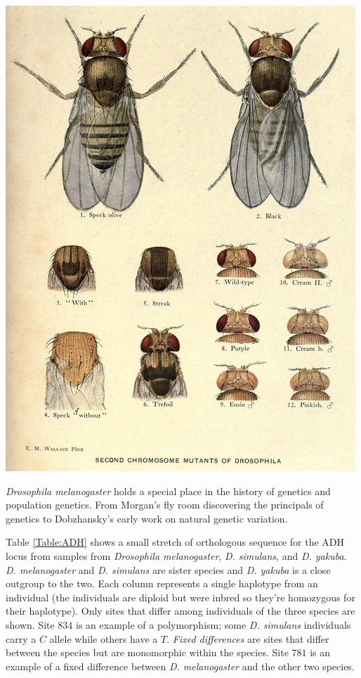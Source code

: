 \begin{marginfigure}[3cm]
\begin{center}
\includegraphics[width= 0.8 \textwidth]{illustration_images/alleles_genotypes/Drosophila_mel/Drosophila_mel_mutants.jpg}
\end{center}
\caption{ {\it Drosophila melanogaster} holds a special place in the
  history of genetics and population genetics. From Morgan's fly room discovering the principals of genetics to Dobzhansky's early work
  on natural genetic variation.   } \label{fig:dros}
\end{marginfigure}



Table \ref{Table:ADH} shows a small stretch of orthologous sequence for
the ADH locus from samples from {\it Drosophila melanogaster},  {\it D. simulans},
and {\it D. yakuba}.  {\it D. melanogaster} and {\it D. simulans} are
sister species and  {\it D. yakuba} is a close outgroup to the two.  Each column represents a single haplotype from an
individual (the individuals are diploid but were inbred so they're
homozygous for their haplotype). Only sites that differ among
individuals of the three species are shown. Site $834$ is an example
of a polymorphism; some  {\it D. simulans} individuals carry a $C$
allele while others have a $T$. \emph{Fixed differences}  are sites that differ between the species but are monomorphic within
  the species. Site $781$ is an example of a fixed difference between
  {\it D. melanogaster} and the other two species.

